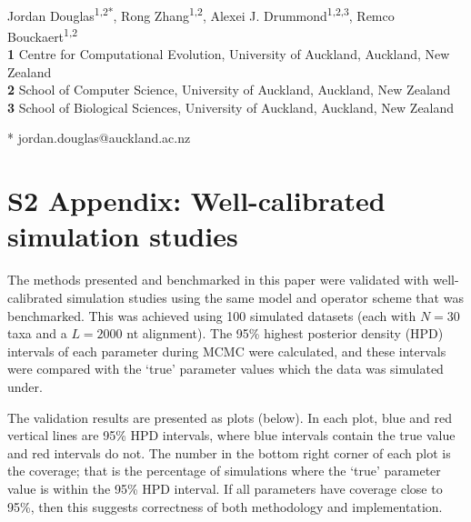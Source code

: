 \documentclass[12pt]{article}
\begin{document}
\vspace*{0.2in}

\begin{flushleft}
{\Large
\textbf{} %
}
\newline
\\
Jordan Douglas\textsuperscript{1,2*},
Rong Zhang\textsuperscript{1,2},
Alexei J. Drummond\textsuperscript{1,2,3},
Remco Bouckaert\textsuperscript{1,2}
\\
\bigskip
\textbf{1} Centre for Computational Evolution,  University of Auckland, Auckland, New Zealand\\
\textbf{2} School of Computer Science, University of Auckland, Auckland, New Zealand\\
\textbf{3} School of Biological Sciences, University of Auckland, Auckland, New Zealand
\\
\bigskip


* jordan.douglas@auckland.ac.nz


\end{flushleft}


\section*{S2 Appendix: Well-calibrated simulation studies}


The methods presented and benchmarked in this paper were validated with well-calibrated simulation studies using the same model and operator scheme that was benchmarked. 
This was achieved using 100 simulated datasets (each with $N=30$ taxa and a $L=2000$ nt alignment).
The 95\% highest posterior density (HPD) intervals of each parameter during MCMC were calculated, and these intervals were compared with the `true' parameter values which the data was simulated under. 


The validation results are presented as plots (below). 
In each plot, blue and red vertical lines are 95\% HPD intervals, where blue intervals contain the true value and red intervals do not.
The number in the bottom right corner of each plot is the coverage; that is the percentage of simulations where the `true' parameter value is within the 95\% HPD interval. 
If all parameters have coverage close to 95\%, then this suggests correctness of both methodology and implementation.
\end{document}
